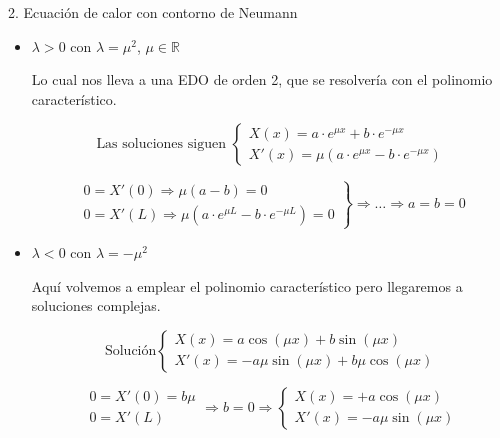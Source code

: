 \begin{example}{2. Ecuación de calor con contorno de Neumann}
\begin{itemize}
				Cuando $\lambda = 0 \Rightarrow X'' = 0$. Así que tenemos que $X'$ tiene que ser constante y $X$ lineal. Pero además los datos iniciales nos indican el valor de $X'$, al ser constante.

				\[ \left.
				\begin{array}{l}
					X(x) = a + bx \\
					\left.
					\begin{array}{r}
						X'(x) = b \\
						X'(0) = X'(L) = 0
					\end{array} \right\} \Rightarrow b = 0
				\end{array} \right\} \Rightarrow X \equiv a \]

				Tiene una solución no trivial que es $\lambda = 0, X=a_0$.

			\item $\lambda > 0$ con $\lambda = \mu^2$, $\mu \in \mathbb{R}$

				Lo cual nos lleva a una EDO de orden 2, que se resolvería con el polinomio característico.

				\[ \text{Las soluciones siguen } \left\{
				   \begin{array}{l}
				   	X(x) = a \cdot e^{\mu x} + b \cdot e^{-\mu x} \\
				   	X'(x) = \mu (a\cdot e^{\mu x} - b\cdot e^{-\mu x})
				   \end{array} \right.
				\]

				\[ \left. \begin{array}{l}
					0 = X'(0) \Rightarrow \mu(a - b) = 0 \\
					0 = X'(L) \Rightarrow \mu(a \cdot e^{\mu L} - b \cdot e^{-\mu L}) = 0
				\end{array} \right\}
					\Rightarrow … \Rightarrow a = b = 0
				\]


			\item $\lambda < 0$ con $\lambda = - \mu^2$

				Aquí volvemos a emplear el polinomio característico pero llegaremos a soluciones complejas.

			 	\[ \text{Solución} \left\{
				   \begin{array}{l}
				   	X(x) = a \cos(\mu x ) + b \sin( \mu x) \\
				   	X'(x) = -a \mu \sin(\mu x) + b \mu \cos(\mu x)
				   \end{array} \right.
				\]

			 	\[
			 		\begin{array}{l}
			 		0 = X'(0) = b \mu \\
			 		0 = X'(L)
			 		\end{array} \Rightarrow b = 0 \Rightarrow \left\{ \begin{array}{l}
			 			X(x) = + a \cos (\mu x ) \\
			 			X'(x) = -a \mu \sin (\mu x)
			 		\end{array} \right.
			 	\]


\end{itemize}
\end{example}
